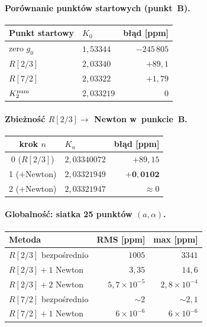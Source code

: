 \paragraph{Por\'ownanie punkt\'ow startowych (punkt~B).}
\begin{center}
\begin{tabular}{l|l|r}
\hline
Punkt startowy & $K_0$ & b\l{}\k{a}d [ppm] \\
\hline
zero $g_0$ & $1{,}53344$ & $-245\,805$ \\
$R[2/3]$ & $2{,}03340$ & $+89{,}1$ \\
$R[7/2]$ & $2{,}03322$ & $+1{,}79$ \\
$K_2^{\rm num}$ & $2{,}033219$ & $0$ \\
\hline
\end{tabular}
\end{center}

\paragraph{Zbie\.zno\'s\'c $R[2/3]\to$ Newton w~punkcie~B.}
\begin{center}
\begin{tabular}{c|l|r}
\hline
krok $n$ & $K_n$ & b\l{}\k{a}d [ppm] \\
\hline
0 ($R[2/3]$) & $2{,}03340072$ & $+89{,}15$ \\
1 ($+$Newton) & $2{,}03321949$ & $\mathbf{+0{,}0102}$ \\
2 ($+$Newton) & $2{,}03321947$ & $\approx 0$ \\
\hline
\end{tabular}
\end{center}

\paragraph{Globalno\'s\'c: siatka 25 punkt\'ow $(a,\alpha)$.}
\begin{center}
\begin{tabular}{l|r|r}
\hline
Metoda & RMS [ppm] & max [ppm] \\
\hline
$R[2/3]$ bezpo\'srednio & $1005$ & $3341$ \\
$R[2/3]+1$ Newton & $3{,}35$ & $14{,}6$ \\
$R[2/3]+2$ Newton & $5{,}7\times10^{-5}$ & $2{,}8\times10^{-4}$ \\
$R[7/2]$ bezpo\'srednio & $\sim 2$ & $\sim 2{,}1$ \\
$R[7/2]+1$ Newton & $6\times10^{-6}$ & $6\times10^{-6}$ \\
\hline
\end{tabular}
\end{center}

